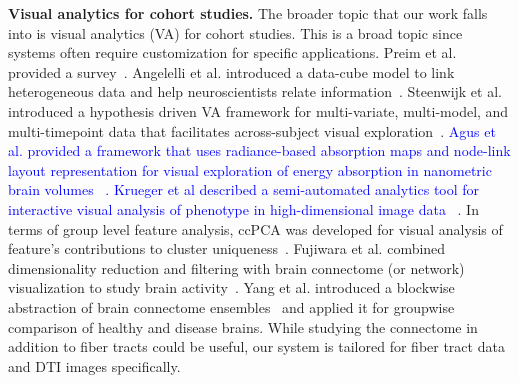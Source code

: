 \vspace{1pt}
\noindent\textbf{Visual analytics for cohort studies.}
The broader topic that our work falls into is visual analytics (VA) for cohort studies. This is a broad topic since systems often require customization for specific applications. Preim et al. provided a survey~\cite{doi:10.1111/cgf.13891}. Angelelli et al. introduced a data-cube model to link heterogeneous data and help neuroscientists relate information~\cite{angelelli2014interactive}. Steenwijk et al. introduced a hypothesis driven VA framework for multi-variate, multi-model, and multi-timepoint data that facilitates across-subject visual exploration~\cite{steenwijk2010integrated}. \textcolor{blue}{Agus et al. provided a framework that uses radiance-based absorption maps and node-link layout representation for visual exploration of energy absorption in nanometric brain volumes ~\cite{https://doi.org/10.1111/cgf.13700}. Krueger et al described a semi-automated analytics tool for interactive visual analysis of phenotype in high-dimensional image data ~\cite{8827951}.} In terms of group level feature analysis, ccPCA 
was developed for visual analysis of feature's contributions to cluster uniqueness~\cite{8805461}.  
Fujiwara et al. combined dimensionality reduction and filtering with brain connectome (or network) visualization to study brain activity~\cite{fujiwara2017visual}. Yang et al. introduced a blockwise abstraction of brain connectome ensembles~\cite{yang2017blockwise} and applied it for groupwise comparison of healthy and disease brains. While studying the connectome in addition to fiber tracts could be useful, our system is tailored for fiber tract data and DTI images specifically.

